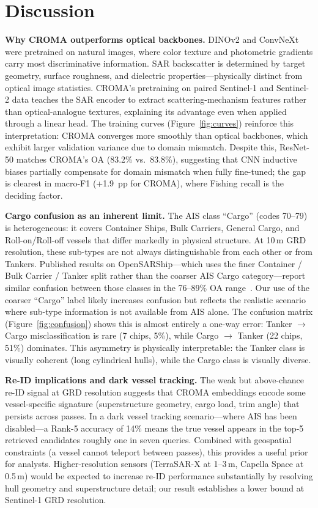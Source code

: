 \documentclass[journal]{IEEEtran}
\begin{document}
\section{Discussion}

\textbf{Why CROMA outperforms optical backbones.}
DINOv2 and ConvNeXt were pretrained on natural images, where color texture
and photometric gradients carry most discriminative information.
SAR backscatter is determined by target geometry, surface roughness, and
dielectric properties---physically distinct from optical image statistics.
CROMA's pretraining on paired Sentinel-1 and Sentinel-2 data teaches the
SAR encoder to extract scattering-mechanism features rather than
optical-analogue textures, explaining its advantage even when applied
through a linear head.
The training curves (Figure~\ref{fig:curves}) reinforce this interpretation:
CROMA converges more smoothly than optical backbones, which exhibit
larger validation variance due to domain mismatch.
Despite this, ResNet-50 matches CROMA's OA (83.2\% vs.\ 83.8\%), suggesting
that CNN inductive biases partially compensate for domain mismatch when
fully fine-tuned; the gap is clearest in macro-F1 (+1.9~pp for CROMA),
where Fishing recall is the deciding factor.

\textbf{Cargo confusion as an inherent limit.}
The AIS class ``Cargo'' (codes 70--79) is heterogeneous: it covers
Container Ships, Bulk Carriers, General Cargo, and Roll-on/Roll-off
vessels that differ markedly in physical structure.
At 10\,m GRD resolution, these sub-types are not always distinguishable
from each other or from Tankers.
Published results on OpenSARShip---which uses the finer Container / Bulk
Carrier / Tanker split rather than the coarser AIS Cargo category---report
similar confusion between those classes in the 76--89\% OA range~\cite{slesinski2025}.
Our use of the coarser ``Cargo'' label likely increases confusion but
reflects the realistic scenario where sub-type information is not available
from AIS alone.
The confusion matrix (Figure~\ref{fig:confusion}) shows this is almost
entirely a one-way error: Tanker $\to$ Cargo misclassification is rare
(7 chips, 5\%), while Cargo $\to$ Tanker (22 chips, 51\%) dominates.
This asymmetry is physically interpretable: the Tanker class is visually
coherent (long cylindrical hulls), while the Cargo class is visually
diverse.

\textbf{Re-ID implications and dark vessel tracking.}
The weak but above-chance re-ID signal at GRD resolution suggests that
CROMA embeddings encode some vessel-specific signature (superstructure
geometry, cargo load, trim angle) that persists across passes.
In a dark vessel tracking scenario---where AIS has been disabled---a
Rank-5 accuracy of 14\% means the true vessel appears in the top-5
retrieved candidates roughly one in seven queries.
Combined with geospatial constraints (a vessel cannot teleport between
passes), this provides a useful prior for analysts.
Higher-resolution sensors (TerraSAR-X at 1--3\,m, Capella Space at
0.5\,m) would be expected to increase re-ID performance substantially by
resolving hull geometry and superstructure detail; our result establishes
a lower bound at Sentinel-1 GRD resolution.
\end{document}
